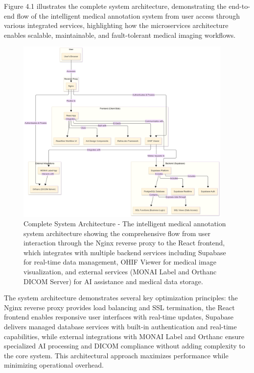 Figure 4.1 illustrates the complete system architecture, demonstrating the end-to-end flow of the intelligent medical annotation system from user access through various integrated services, highlighting how the microservices architecture enables scalable, maintainable, and fault-tolerant medical imaging workflows.

\begin{figure}[htbp]
\centering
\includegraphics[width=0.95\textwidth]{content/resources/images/chap4-system-design/system-architecture.png}
\caption{Complete System Architecture - The intelligent medical annotation system architecture showing the comprehensive flow from user interaction through the Nginx reverse proxy to the React frontend, which integrates with multiple backend services including Supabase for real-time data management, OHIF Viewer for medical image visualization, and external services (MONAI Label and Orthanc DICOM Server) for AI assistance and medical data storage.}
\label{fig:system-architecture}
\end{figure}

The system architecture demonstrates several key optimization principles: the Nginx reverse proxy provides load balancing and SSL termination, the React frontend enables responsive user interfaces with real-time updates, Supabase delivers managed database services with built-in authentication and real-time capabilities, while external integrations with MONAI Label and Orthanc ensure specialized AI processing and DICOM compliance without adding complexity to the core system. This architectural approach maximizes performance while minimizing operational overhead.

